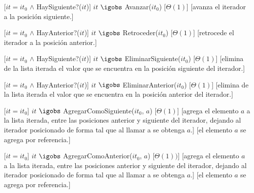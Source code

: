 \begin{Interfaz}
  [$it = it_0$ $\land$ HaySiguiente?($it$)]
  {$it$ $\igobs$ Avanzar($it_0$)}
  [$\Theta(1)$]
  [avanza el iterador a la posición siguiente.]

  [$it = it_0$ $\land$ HayAnterior?($it$)]
  {$it$ $\igobs$ Retroceder($it_0$)}
  [$\Theta(1)$]
  [retrocede el iterador a la posición anterior.]

  [$it = it_0$ $\land$ HaySiguiente?($it$)]
  {$it$ $\igobs$ EliminarSiguiente($it_0$)}
  [$\Theta(1)$]
  [elimina de la lista iterada el valor que se encuentra en la posición siguiente del iterador.]

  [$it = it_0$ $\land$ HayAnterior?($it$)]
  {$it$ $\igobs$ EliminarAnterior($it_0$)}
  [$\Theta(1)$]
  [elimina de la lista iterada el valor que se encuentra en la posición anterior del iterador.]

  [$it = it_0$]
  {$it$ $\igobs$ AgregarComoSiguiente($it_0$, $a$)}
  [$\Theta(1)$]
  [agrega el elemento $a$ a la lista iterada, entre las posiciones anterior y siguiente del iterador, dejando al iterador posicionado de forma tal que al llamar a  se obtenga $a$.]
  [el elemento $a$ se agrega por referencia.]

  [$it = it_0$]
  {$it$ $\igobs$ AgregarComoAnterior($it_0$, $a$)}
  [$\Theta(1))$]
  [agrega el elemento $a$ a la lista iterada, entre las posiciones anterior y siguiente del iterador, dejando al iterador posicionado de forma tal que al llamar a  se obtenga $a$.]
  [el elemento $a$ se agrega por referencia.]

\end{Interfaz}


